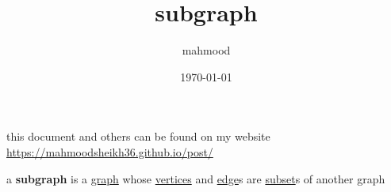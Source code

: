 \documentclass[a4paper,12pt]{article}
\author{mahmood}
\date{\today}
\title{subgraph}
\begin{document}
\maketitle
\begin{note}
this document and others can be found on my website\\
\url{https://mahmoodsheikh36.github.io/post/}
\end{note}
\begin{definition}
a \textbf{subgraph} is a \href{20230314001051-graph.org}{graph} whose \href{20230314001051-graph.org}{vertices} and \href{20230314001632-edge.org}{edge}s are \href{discrete_maths2.org}{subset}s of another graph\\
\end{definition}
\end{document}
